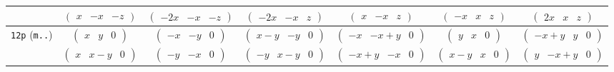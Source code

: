\documentclass[fleqn,9pt,landscape]{jsarticle}
\begin{document}
\begin{center}
\begin{longtable}{ccccccc}
& $ \begin{pmatrix} x & - x & - z \end{pmatrix} $ & $ \begin{pmatrix} - 2 x & - x & - z \end{pmatrix} $ & $ \begin{pmatrix} - 2 x & - x & z \end{pmatrix} $ & $ \begin{pmatrix} x & - x & z \end{pmatrix} $ & $ \begin{pmatrix} - x & x & z \end{pmatrix} $ & $ \begin{pmatrix} 2 x & x & z \end{pmatrix} $ \\ \hline
{\tt 12p} ({\tt m..}) & $ \begin{pmatrix} x & y & 0 \end{pmatrix} $ & $ \begin{pmatrix} - x & - y & 0 \end{pmatrix} $ & $ \begin{pmatrix} x - y & - y & 0 \end{pmatrix} $ & $ \begin{pmatrix} - x & - x + y & 0 \end{pmatrix} $ & $ \begin{pmatrix} y & x & 0 \end{pmatrix} $ & $ \begin{pmatrix} - x + y & y & 0 \end{pmatrix} $ \\
& $ \begin{pmatrix} x & x - y & 0 \end{pmatrix} $ & $ \begin{pmatrix} - y & - x & 0 \end{pmatrix} $ & $ \begin{pmatrix} - y & x - y & 0 \end{pmatrix} $ & $ \begin{pmatrix} - x + y & - x & 0 \end{pmatrix} $ & $ \begin{pmatrix} x - y & x & 0 \end{pmatrix} $ & $ \begin{pmatrix} y & - x + y & 0 \end{pmatrix} $ \\ \hline

\end{longtable}
\end{center}
\end{document}
